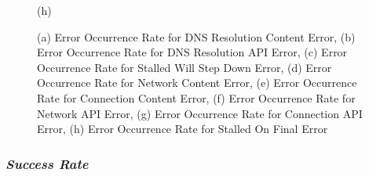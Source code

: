 \begin{figure}[!ht]
\begin{minipage}{0.5\textwidth}
		\caption[Occurrence Rate Stalled On Final Error]{(h)}
		\label{fig:Occurrence Rate Stalled On Final Error}
	\end{minipage}
	\caption[Error Occurrence Rate Time series for Each Error]{(a) Error Occurrence Rate for DNS Resolution Content Error, (b) Error Occurrence Rate for DNS Resolution API Error, 
(c) Error Occurrence Rate for Stalled Will Step Down Error, (d) Error Occurrence Rate for Network Content Error, (e) Error Occurrence Rate for Connection Content Error, 
(f) Error Occurrence Rate for Network API Error, (g) Error Occurrence Rate for Connection API Error, (h) Error Occurrence Rate for Stalled On Final Error}
	\label{fig:Error Occurrence Rate Time series for Each Error}
\end{figure}

\FloatBarrier
\subsubsection*{\textit{Success Rate}}

